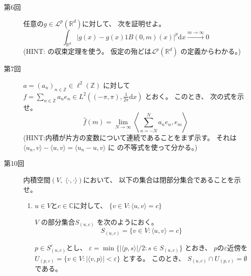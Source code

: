 \documentclass[12pt,b5paper]{ltjsarticle}
\begin{document}
\hrulefill

\begin{description}
 \item [第6回]
      任意の$g\in \mathcal{L}^{p}(\mathbb{R}^{d})$に対して、
      次を証明せよ。
      \begin{equation}
       \int_{\mathbb{R}^{d}}
        \lvert g(x) - g(x)1{B(0,m)}(x) \rvert^{p}
        \mathrm{d}x
        \overset{m \to \infty}{\longrightarrow}
        0
      \end{equation}
      (HINT:  の収束定理を使う。
      仮定の殆どは$\mathcal{L}^{p}(\mathbb{R}^{d})$
      の定義からわかる。)



 \item [第7回]
      $a = (a_{n})_{n\in\mathbb{Z}} \in \ell^{2}(\mathbb{Z})$
      に対して
      $f=\sum_{n\in\mathbb{Z}} a_{n}e_{n}
             \in L^{2}((-\pi,\pi),\frac{1}{2\pi}\mathrm{d}x)$
      とおく。
      このとき、
      次の式を示せ。
      \begin{equation}
       \hat{f}(m) = \lim_{N\to\infty}
        \left\langle \sum_{n=-N}^{N}a_{n}e_{n},e_{m} \right\rangle
      \end{equation}
      (HINT:内積が片方の変数について連続であることをまず示す。
      それは$\langle u_{n},v\rangle - \langle u,v\rangle
             = \langle u_{n}-u,v \rangle$ に
      の不等式を使って分かる。)

             \dotfill




            \hrulefill

 \item [第10回]
      内積空間$(V,\; \langle \cdot , \cdot \rangle)$において、
      以下の集合は閉部分集合であることを示せ。
      \begin{enumerate}
       \item
            $u\in V$と$c\in \mathbb{C}$に対して、
            $\{ v\in V : \langle u,v\rangle =c \}$

            \dotfill

            $V$ の部分集合$S_{(u,c)}$ を次のようにおく。
            \begin{equation}
             S_{(u,c)} = \{ v\in V : \langle u,v\rangle =c \}
            \end{equation}

            $p \in S_{(u,c)}^{c}$とし、
            $\varepsilon=\min \{ \lvert \langle p,s \rangle \rvert/2 : s \in S_{(u,c)} \}$
            とおき、
            $p$の$\varepsilon$近傍を
            $U_{(p,\varepsilon)}= \{ v\in V : \lvert \langle v,p \rangle \rvert < \varepsilon \}$
            とする。
            このとき、
            $S_{(u,c)} \cap U_{(p,\varepsilon)} = \emptyset$
            である。


\end{enumerate}
\end{description}
\end{document}
